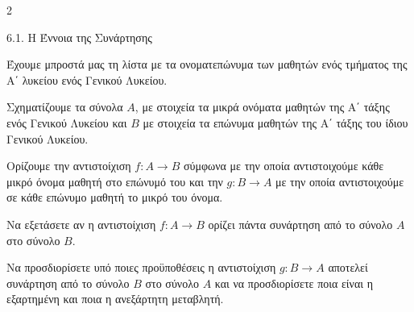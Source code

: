 \begin{ylh}{2}
    \item 6.1. Η Έννοια της Συνάρτησης
\end{ylh}
Έχουμε μπροστά μας τη λίστα με τα ονοματεπώνυμα των μαθητών ενός τμήματος της Α΄ λυκείου ενός Γενικού Λυκείου.

Σχηματίζουμε τα σύνολα $A$, με στοιχεία τα μικρά ονόματα μαθητών της Α΄ τάξης ενός Γενικού Λυκείου και $B$ με στοιχεία τα επώνυμα μαθητών της Α΄ τάξης του ίδιου Γενικού Λυκείου.

Ορίζουμε την αντιστοίχιση $f:A \rightarrow B$ σύμφωνα με την οποία αντιστοιχούμε κάθε μικρό όνομα μαθητή στο επώνυμό του και την $g:B \rightarrow A$ με την οποία αντιστοιχούμε σε κάθε επώνυμο μαθητή το μικρό του όνομα.
\begin{alist}
\item Να εξετάσετε αν η αντιστοίχιση $f:A \rightarrow B$ ορίζει πάντα συνάρτηση από το σύνολο $A$ στο σύνολο $B$.
\item Να προσδιορίσετε υπό ποιες προϋποθέσεις η αντιστοίχιση $g:B \rightarrow A$ αποτελεί συνάρτηση από το σύνολο $B$ στο σύνολο $A$ και να προσδιορίσετε ποια είναι η εξαρτημένη και ποια η ανεξάρτητη μεταβλητή.

\end{alist}

